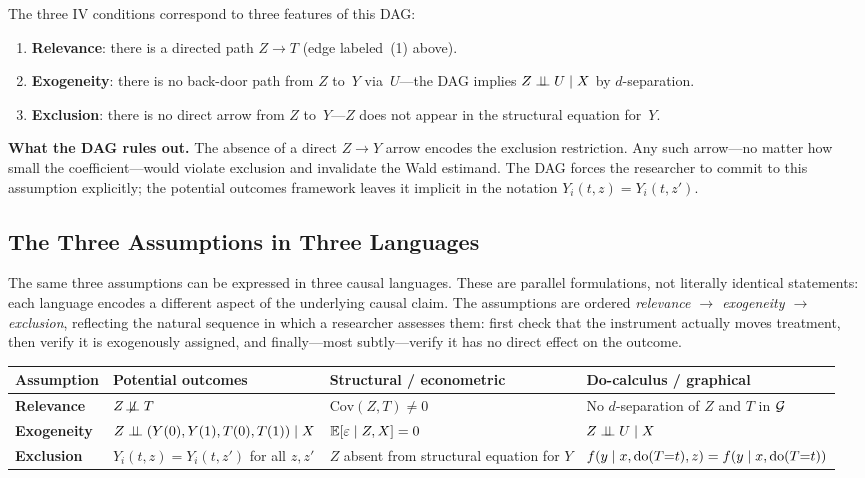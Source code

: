 \documentclass[master.tex]{subfiles}
\begin{document}
\medskip\noindent The three IV conditions correspond to three
features of this DAG:
\begin{enumerate}
  \item \textbf{Relevance}: there is a directed path $Z \to T$
    (edge labeled~(1) above).
  \item \textbf{Exogeneity}: there is no back-door path from $Z$
    to~$Y$ via~$U$---the DAG implies $Z \perp\!\!\!\perp U \mid X$ by
    $d$-separation.
  \item \textbf{Exclusion}: there is no direct arrow from $Z$
    to~$Y$---$Z$ does not appear in the structural equation
    for~$Y$.
\end{enumerate}

\noindent\textbf{What the DAG rules out.}  The absence of a direct
$Z \to Y$ arrow encodes the exclusion restriction.  Any such
arrow---no matter how small the coefficient---would violate exclusion
and invalidate the Wald estimand.  The DAG forces the researcher to
commit to this assumption explicitly; the potential outcomes
framework leaves it implicit in the notation
$Y_i(t,z) = Y_i(t,z')$.

\subsection{The Three Assumptions in Three Languages}

The same three assumptions can be expressed in three causal
languages.  These are parallel formulations, not literally identical
statements: each language encodes a different aspect of the
underlying causal claim.  The assumptions are ordered
\emph{relevance $\to$ exogeneity $\to$ exclusion}, reflecting the
natural sequence in which a researcher assesses them: first check
that the instrument actually moves treatment, then verify it is
exogenously assigned, and finally---most subtly---verify it has no
direct effect on the outcome.

\medskip
\renewcommand{\arraystretch}{2.0}
\begin{tabular}{@{}p{2.1cm} p{3.9cm} p{3.9cm} p{3.9cm}@{}}
  \toprule
  \textbf{Assumption}
    & \textbf{Potential outcomes}
    & \textbf{Structural / econometric}
    & \textbf{Do-calculus / graphical} \\
  \midrule
  \textbf{Relevance}
    & $Z \not\!\perp\!\!\!\perp T$
    & $\mathrm{Cov}(Z, T) \neq 0$
    & No $d$-separation of $Z$ and $T$ in $\mathcal{G}$ \\
  \textbf{Exogeneity}
    & $Z \perp\!\!\!\perp (Y(0), Y(1), T(0), T(1)) \mid X$
    & $\mathbb{E}[\varepsilon \mid Z, X] = 0$
    & $Z \perp\!\!\!\perp U \mid X$ \\
  \textbf{Exclusion}
    & $Y_i(t, z) = Y_i(t, z')$ for all $z, z'$
    & $Z$ absent from structural equation for $Y$
    & $f(y \mid x, \mathrm{do}(T{=}t), z)
       = f(y \mid x, \mathrm{do}(T{=}t))$ \\
  \bottomrule
\end{tabular}
\renewcommand{\arraystretch}{1}
\end{document}

